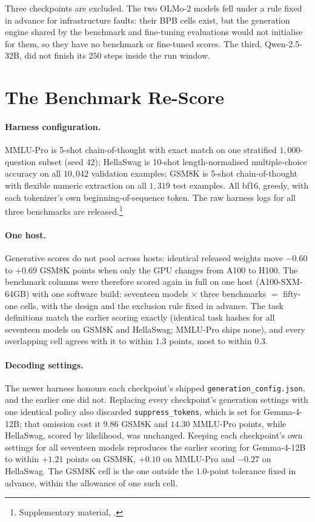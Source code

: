\documentclass[10pt]{article}
\newcommand{\repourl}{https://github.com/DavidAfonsoValente/entropy-bench}
\newcommand{\repolink}[1]{\expandafter\url\expandafter{\detokenize\expandafter{\repourl#1}}}
\newcommand{\artifact}[1]{\footnote{Supplementary material, \texttt{\detokenize{#1}}.}}
\newcommand{\artifact}[1]{\footnote{\repolink{/tree/main/#1}}}
\begin{document}
Three checkpoints are excluded. The two OLMo-2 models fell under a rule fixed in advance for
infrastructure faults: their BPB cells exist, but the generation engine shared by the benchmark and
fine-tuning evaluations would not initialise for them, so they have no benchmark or fine-tuned
scores. The third, Qwen-2.5-32B, did not finish its $250$ steps inside the run window.

\section{The Benchmark Re-Score}
\label{app:rescore}
\paragraph{Harness configuration.} MMLU-Pro is 5-shot chain-of-thought with exact match on one
stratified $1{,}000$-question subset (seed 42); HellaSwag is 10-shot length-normalised
multiple-choice accuracy on all $10{,}042$ validation examples; GSM8K is 5-shot chain-of-thought with
flexible numeric extraction on all $1{,}319$ test examples. All bf16, greedy, with each tokenizer's
own beginning-of-sequence token. The raw harness logs for all three
benchmarks are released.\artifact{results}

\paragraph{One host.} Generative scores do not pool across hosts: identical released weights move
$-0.60$ to $+0.69$ GSM8K points when only the GPU changes from A100 to H100. The benchmark columns were therefore scored again in full on one host
(A100-SXM-64GB) with one software build: seventeen models $\times$ three benchmarks $=$ fifty-one
cells, with the design and the exclusion rule fixed in advance. The task definitions match the
earlier scoring exactly (identical task hashes for all seventeen models on GSM8K and HellaSwag; MMLU-Pro ships none), and
every overlapping cell agrees with it to within $1.3$ points, most to within $0.3$.

\paragraph{Decoding settings.} The newer harness honours each checkpoint's shipped
\texttt{generation\_config.json}, and the earlier one did not. Replacing every checkpoint's
generation settings with one identical policy also discarded \texttt{suppress\_tokens}, which is set
for Gemma-4-12B; that omission cost it $9.86$ GSM8K and $14.30$ MMLU-Pro points, while HellaSwag,
scored by likelihood, was unchanged. Keeping each checkpoint's own settings for all seventeen models
reproduces the earlier scoring for Gemma-4-12B to within $+1.21$ points on GSM8K, $+0.10$ on MMLU-Pro
and $-0.27$ on HellaSwag. The GSM8K cell is the one outside the $1.0$-point tolerance fixed in
advance, within the allowance of one such cell.
\end{document}
